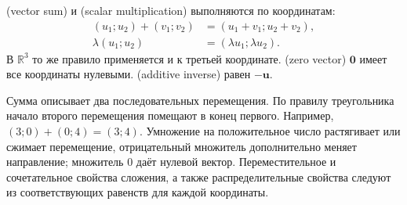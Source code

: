 \begin{definition}
 (vector sum) и  (scalar multiplication) выполняются по координатам:
\[
\begin{aligned}
(u_1;u_2)+(v_1;v_2)&=(u_1+v_1;u_2+v_2),\\
\lambda(u_1;u_2)&=(\lambda u_1;\lambda u_2).
\end{aligned}
\]
В \(\mathbb R^3\) то же правило применяется и к третьей координате.  (zero vector) \(\symbf0\) имеет все координаты нулевыми.  (additive inverse) равен \(-\symbf u\).
\end{definition}
Сумма описывает два последовательных перемещения. По правилу треугольника начало второго перемещения помещают в конец первого. Например, \((3;0)+(0;4)=(3;4)\). Умножение на положительное число растягивает или сжимает перемещение, отрицательный множитель дополнительно меняет направление; множитель \(0\) даёт нулевой вектор. Переместительное и сочетательное свойства сложения, а также распределительные свойства следуют из соответствующих равенств для каждой координаты.

